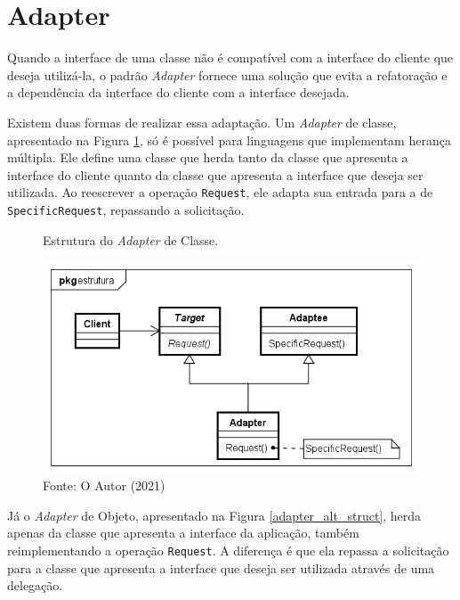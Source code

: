 
\section{Adapter}

Quando a interface de uma classe não 
é compatível com a interface do cliente que deseja 
utilizá-la, o padrão \textit{Adapter} fornece uma 
solução que evita a refatoração e a dependência da 
interface do cliente com a interface desejada.\cite{gamma:1995}

Existem duas formas de realizar essa adaptação. Um \textit{Adapter} 
de classe, apresentado na Figura \ref{adapter_struct},  
só é possível para linguagens que implementam herança 
múltipla.
Ele define uma classe que herda tanto da classe que 
apresenta a interface do cliente quanto da classe que 
apresenta a interface que deseja ser utilizada. Ao 
reescrever a operação \texttt{Request}, ele adapta sua entrada 
para a de \texttt{SpecificRequest}, repassando a solicitação.\cite{gamma:1995}

\begin{figure}[htb]
	\caption{\label{adapter_struct}Estrutura do \textit{Adapter} de Classe.}
	\begin{center}
	    \includegraphics[scale=0.5]{5_padroes-contexto-funcional/5.2_estruturais/5.2.1_adapter/adapter_classe_estrutura.png}
	\end{center}
  \caption*{Fonte: O Autor (2021)}
\end{figure}

Já o \textit{Adapter} de Objeto, apresentado na Figura \ref{adapter_alt_struct}, 
herda apenas da classe que apresenta a interface 
da aplicação, também reimplementando a operação \texttt{Request}. 
A diferença é que ela repassa a solicitação para a 
classe que apresenta a interface que deseja ser 
utilizada através de uma delegação.\cite{gamma:1995}

